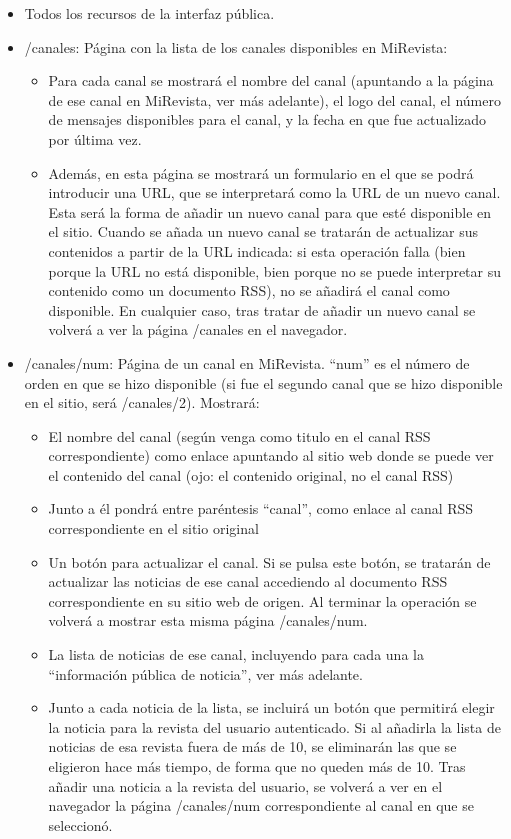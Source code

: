 \begin{itemize}
\item Todos los recursos de la interfaz pública.
\item /canales: Página con la lista de los canales disponibles en MiRevista:

  \begin{itemize}
  \item Para cada canal se mostrará el nombre del canal (apuntando a la página de ese canal en MiRevista, ver más adelante), el logo del canal, el número de mensajes disponibles para el canal, y la fecha en que fue actualizado por última vez.
  \item Además, en esta página se mostrará un formulario en el que se podrá introducir una URL, que se interpretará como la URL de un nuevo canal. Esta será la forma de añadir un nuevo canal para que esté disponible en el sitio. Cuando se añada un nuevo canal se tratarán de actualizar sus contenidos a partir de la URL indicada: si esta operación falla (bien porque la URL no está disponible, bien porque no se puede interpretar su contenido como un documento RSS), no se añadirá el canal como disponible. En cualquier caso, tras tratar de añadir un nuevo canal se volverá a ver la página /canales en el navegador.
  \end{itemize}

\item /canales/num: Página de un canal en MiRevista. ``num'' es el número de orden en que se hizo disponible (si fue el segundo canal que se hizo disponible en el sitio, será /canales/2). Mostrará:

  \begin{itemize}
  \item El nombre del canal (según venga como titulo en el canal RSS correspondiente) como enlace apuntando al sitio web donde se puede ver el contenido del canal (ojo: el contenido original, no el canal RSS)
  \item Junto a él pondrá entre paréntesis ``canal'', como enlace al canal RSS correspondiente en el sitio original
  \item Un botón para actualizar el canal. Si se pulsa este botón, se tratarán de actualizar las noticias de ese canal accediendo al documento RSS correspondiente en su sitio web de origen. Al terminar la operación se volverá a mostrar esta misma página /canales/num.
  \item La lista de noticias de ese canal, incluyendo para cada una la ``información pública de noticia'', ver más adelante.
  \item Junto a cada noticia de la lista, se incluirá un botón que permitirá elegir la noticia para la revista del usuario autenticado. Si al añadirla la lista de noticias de esa revista fuera de más de 10, se eliminarán las que se eligieron hace más tiempo, de forma que no queden más de 10. Tras añadir una noticia a la revista del usuario, se volverá a ver en el navegador la página /canales/num correspondiente al canal en que se seleccionó.
  \end{itemize}


\end{itemize}
